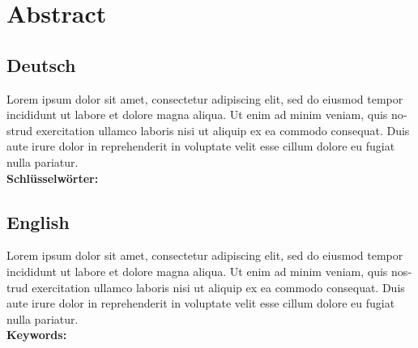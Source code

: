 \chapter*{Abstract}
\begin{otherlanguage}{ngerman}
\section*{Deutsch}
Lorem ipsum dolor sit amet, consectetur adipiscing elit, sed do eiusmod tempor incididunt ut labore et dolore magna aliqua. Ut enim ad minim veniam, quis nostrud exercitation ullamco laboris nisi ut aliquip ex ea commodo consequat. Duis aute irure dolor in reprehenderit in voluptate velit esse cillum dolore eu fugiat nulla pariatur.
\\[2ex]
\textbf{Schl\"usselw\"orter:} \itshape \germankeywords
\end{otherlanguage}

\begin{otherlanguage}{english}
\section*{English}
Lorem ipsum dolor sit amet, consectetur adipiscing elit, sed do eiusmod tempor incididunt ut labore et dolore magna aliqua. Ut enim ad minim veniam, quis nostrud exercitation ullamco laboris nisi ut aliquip ex ea commodo consequat. Duis aute irure dolor in reprehenderit in voluptate velit esse cillum dolore eu fugiat nulla pariatur.
\\[2ex]
\textbf{Keywords:} \itshape \englishkeywords
\end{otherlanguage}

